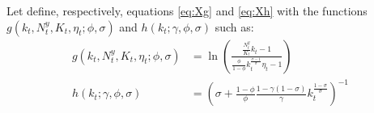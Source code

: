 Let define, respectively, equations \eqref{eq:Xg} and \eqref{eq:Xh} with the functions $g(k_t, N_t^y, K_t, \eta_t; \phi, \sigma)$ and $h(k_t ; \gamma, \phi, \sigma)$ such as:
	\begin{align*}
		g(k_t, N_t^y, K_t, \eta_t; \phi, \sigma) &= \ln\left( \frac{ \frac{N_t^y}{K_t} k_t - 1 } { \frac{\phi}{1-\phi} k_t^{\frac{\sigma-1}{\sigma}} \eta_t - 1 }\right) \\
		h(k_t ; \gamma, \phi, \sigma) &= \left( \sigma + \frac{1-\phi}{\phi} \frac{1-\gamma(1-\sigma)}{\gamma} k_t^{\frac{1-\sigma}{\sigma}} \right)^{-1}
	\end{align*}


